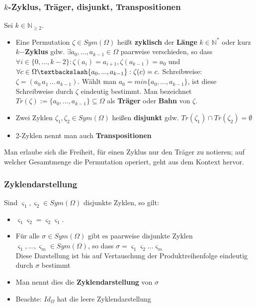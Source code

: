 \documentclass[titlepage]{article}
\newcommand{\N}{\mathbb{N}}
\newcommand{\1}{\mathbb{1}}
\newcommand{\0}{\mathbb{0}}
\begin{document}
				\subsubsection{$k$-Zyklus, Träger, disjunkt, Transpositionen}
					Sei $k\in\N_{\ge2}$.
					\begin{itemize}
						\item Eine Permutation $\zeta\in Sym(\Omega)$ heißt \textbf{zyklisch} der \textbf{Länge} $k\in\N^*$ oder kurz $k$\textbf{$-$Zyklus} gdw. $\exists a_0,...,a_{k-1}\in\Omega$ paarweise verschieden, so dass $\forall i\in\{0,...,k-2\}:\zeta(a_i)=a_{i+1},\zeta(a_{k-1})=a_0$ und $\forall c\in \Omega\textbackslash\{a_0,...,a_{k-1}\}:\zeta(c)=c.$ Schreibweise: $\zeta=(a_0\,a_1\,...\,a_{k-1})$. Wählt man $a_0=min\{a_0,...,a_{k-1}\}$, ist diese Schreibweise durch $\zeta$ eindeutig bestimmt. Man bezeichnet $Tr(\zeta):=\{a_0,...,a_{k-1}\}\subseteq\Omega$ als \textbf{Träger} oder \textbf{Bahn} von $\zeta$.
						\item Zwei Zyklen $\zeta_1,\zeta_2\in Sym(\Omega)$ heißen \textbf{disjunkt} gdw. $Tr(\zeta_1)\cap Tr(\zeta_2)=\emptyset$
						\item 2-Zyklen nennt man auch \textbf{Transpositionen}
					\end{itemize}
					Man erlaube sich die Freiheit, für einen Zyklus nur den Träger zu notieren; auf welcher Gesamtmenge die Permutation operiert, geht aus dem Kontext hervor.
				\subsubsection{Zyklendarstellung}
					Sind $\varsigma_1,\varsigma_2\in Sym(\Omega)$ disjunkte Zyklen, so gilt:
					\begin{itemize}
						\item $\varsigma_1\varsigma_2=\varsigma_2\varsigma_1$.
						\item Für alle $\sigma\in Sym(\Omega)$ gibt es paarweise disjunkte Zyklen $\varsigma_1,...,\varsigma_m\in Sym(\Omega)$, so dass $\sigma=\varsigma_1\varsigma_2\dots\varsigma_m$\\
						Diese Darstellung ist bis auf Vertauschung der Produktreihenfolge eindeutig durch $\sigma$ bestimmt
						\item Man nennt dies die \textbf{Zyklendarstellung} von $\sigma$
						\item Beachte: $Id_\Omega$ hat die leere Zyklendarstellung
					\end{itemize} 
\end{document}
